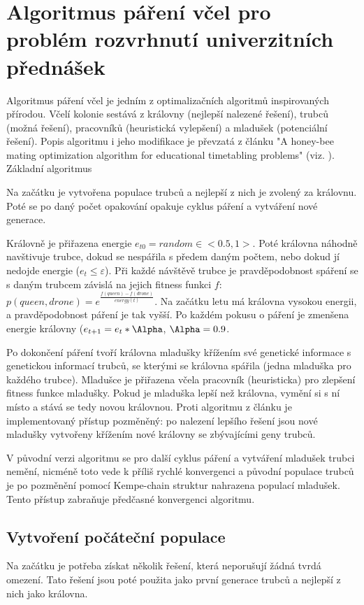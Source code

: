 \documentclass[12pt, a4paper]{article}
\let\epsilon\varepsilon
\begin{document}
\section{Algoritmus páření včel pro problém rozvrhnutí univerzitních přednášek}
Algoritmus páření včel je jedním z optimalizačních algoritmů inspirovaných přírodou.
Včelí kolonie sestává z královny (nejlepší nalezené řešení), trubců (možná řešení), pracovníků (heuristická vylepšení)
a mladušek (potenciální řešení). Popis algoritmu i jeho modifikace je převzatá z článku "A honey-bee mating optimization algorithm for educational timetabling problems" (viz. \cite{HoneyBee}).
Základní algoritmus 

Na začátku je vytvořena populace trubců a nejlepší z nich je zvolený za královnu.
Poté se po daný počet opakování opakuje cyklus páření a vytváření nové generace.

Královně je přiřazena energie $e_{t0} = random \in <0.5, 1>$.
Poté královna náhodně navštivuje trubce, dokud se nespářila s předem daným počtem, nebo dokud jí nedojde energie ($e_t \leq \epsilon$).
Při každé návštěvě trubce je pravděpodobnost spáření se s daným trubcem závislá na jejich fitness funkci $f$:
$p(queen, drone) = e^{\frac{f(queen) - f(drone)}{energy(t)}}$.
Na začátku letu má královna vysokou energii, a pravděpodobnost páření je tak vyšší.
Po každém pokusu o páření je zmenšena energie královny ($e_{t+1} = e_{t} * \Alpha$, $\Alpha = 0.9$.

Po dokončení páření tvoří královna mladušky křížením své genetické informace s genetickou informací trubců, se kterými se královna spářila (jedna mladuška pro každého trubce).
Mladušce je přiřazena včela pracovník (heuristicka) pro zlepšení fitness funkce mladušky.
Pokud je mladuška lepší než královna, vymění si s ní místo a stává se tedy novou královnou.
Proti algoritmu z článku je implementovaný přístup pozměněný: po nalezení lepšího řešení jsou nové mladušky vytvořeny křížením
nové královny se zbývajícími geny trubců.

V původní verzi algoritmu se pro další cyklus páření a vytváření mladušek trubci nemění, nicméně toto vede k příliš rychlé konvergenci
a původní populace trubců je po pozměnění pomocí Kempe-chain struktur nahrazena populací mladušek.
Tento přístup zabraňuje předčasné konvergenci algoritmu.

\subsection{Vytvoření počáteční populace}
Na začátku je potřeba získat několik řešení, která neporušují žádná tvrdá omezení.
Tato řešení jsou poté použita jako první generace trubců a nejlepší z nich jako královna.
\end{document}

